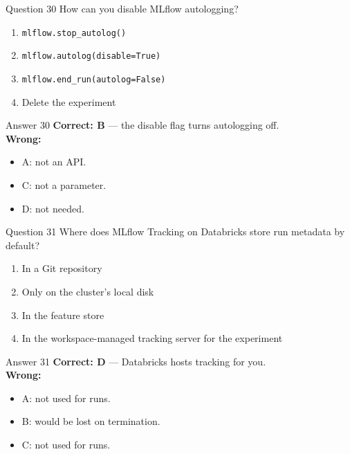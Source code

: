 \documentclass[aspectratio=169,11pt]{beamer}
\begin{document}
\begin{frame}{Question 30}
How can you disable MLflow autologging?
\begin{enumerate}[label=\Alph*.]
\item \texttt{mlflow.stop\_autolog()}
\item \texttt{mlflow.autolog(disable=True)}
\item \texttt{mlflow.end\_run(autolog=False)}
\item Delete the experiment
\end{enumerate}
\end{frame}
\begin{frame}{Answer 30}
\textbf{Correct: B} --- the disable flag turns autologging off.\\
\vspace{0.5em}
\textbf{Wrong:}
\begin{itemize}
\item A: not an API.
\item C: not a parameter.
\item D: not needed.
\end{itemize}
\end{frame}

\begin{frame}{Question 31}
Where does MLflow Tracking on Databricks store run metadata by default?
\begin{enumerate}[label=\Alph*.]
\item In a Git repository
\item Only on the cluster's local disk
\item In the feature store
\item In the workspace-managed tracking server for the experiment
\end{enumerate}
\end{frame}
\begin{frame}{Answer 31}
\textbf{Correct: D} --- Databricks hosts tracking for you.\\
\vspace{0.5em}
\textbf{Wrong:}
\begin{itemize}
\item A: not used for runs.
\item B: would be lost on termination.
\item C: not used for runs.
\end{itemize}
\end{frame}
\end{document}
